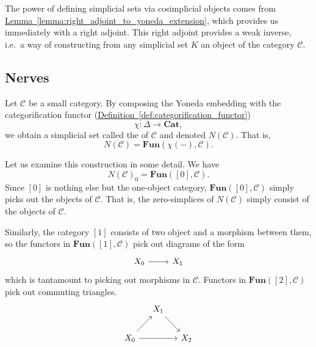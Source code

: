 \documentclass[main.tex]{subfiles}
\begin{document}
The power of defining simplicial sets via cosimplicial objects comes from \hyperref[lemma:right_adjoint_to_yoneda_extension]{Lemma~\ref*{lemma:right_adjoint_to_yoneda_extension}}, which provides us immediately with a right adjoint. This right adjoint provides a weak inverse, i.e.\ a way of constructing from any simplicial set $K$ an object of the category $\mathcal{C}$.

\subsection{Nerves}
\label{ssc:nerves}

\begin{definition}
  \label{def:nerve_of_a_category}
  Let $\mathcal{C}$ be a small category. By composing the Yoneda embedding with the categorification functor (\hyperref[def:categorification_functor]{Definition~\ref*{def:categorification_functor}})
  \begin{equation*}
    \chi\colon \Delta \to \mathbf{Cat},
  \end{equation*}
  we obtain a simplicial set called the  of $\mathcal{C}$ and denoted $N(\mathcal{C})$. That is,
  \begin{equation*}
    N(\mathcal{C}) = \mathbf{Fun}(\chi(-), \mathcal{C}).
  \end{equation*}
\end{definition}

Let us examine this construction in some detail. We have
\begin{equation*}
  N(\mathcal{C})_{0} = \mathbf{Fun}([0], \mathcal{C}).
\end{equation*}
Since $[0]$ is nothing else but the one-object category, $\mathbf{Fun}([0], \mathcal{C})$ simply picks out the objects of $\mathcal{C}$. That is, the zero-simplices of $N(\mathcal{C})$ simply consist of the objects of $\mathcal{C}$.

Similarly, the category $[1]$ consists of two object and a morphism between them, so the functors in $\mathbf{Fun}([1], \mathcal{C})$ pick out diagrams of the form
\begin{equation*}
  \begin{tikzcd}
    X_{0}
    \arrow[r]
    & X_{1}
  \end{tikzcd}
\end{equation*}
which is tantamount to picking out morphisms in $\mathcal{C}$. Functors in $\mathbf{Fun}([2], \mathcal{C})$ pick out commuting triangles.
\begin{equation*}
  \begin{tikzcd}[column sep=small]
    & X_{1}
    \arrow[dr]
    \\
    X_{0}
    \arrow[rr]
    \arrow[ur]
    && X_{2}
  \end{tikzcd}
\end{equation*}
\end{document}
